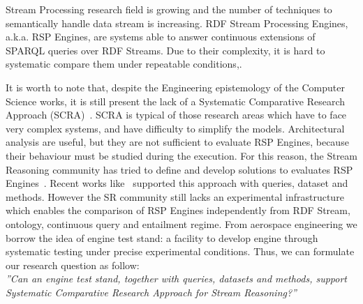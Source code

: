 Stream Processing research field is growing and the number of techniques to semantically handle data stream is increasing. RDF Stream Processing Engines, a.k.a. RSP Engines, are systems able to answer continuous extensions of SPARQL queries over RDF Streams. Due to their complexity, it is hard to systematic compare them under repeatable conditions,. 

It is worth to note that, despite the Engineering epistemology of the Computer Science works, it is still present the lack of a Systematic Comparative Research Approach (SCRA)~\cite{Tichy:1995:EEC:209090.209093}. SCRA is typical of those research areas which have to face very complex systems, and have difficulty to simplify the models. Architectural analysis are useful, but they are not sufficient to evaluate RSP Engines, because their behaviour must be studied during the execution. For this reason, the Stream Reasoning community has tried to define and develop solutions to evaluates RSP Engines~\cite{DBLP:conf/esws/ScharrenbachUMVB13}. Recent works like~\cite{Zhang2012, LePhuoc2012c, DBLP:conf/semweb/DellAglioCBCV13} supported this approach with queries, dataset and methods. However the SR community still lacks an experimental infrastructure which enables the comparison of RSP Engines independently from RDF Stream, ontology, continuous query and entailment regime.  From aerospace engineering we borrow the idea of engine test stand: a facility to develop engine through systematic testing under precise experimental conditions. Thus, we can formulate our research question as follow:\\

\textit{”Can an engine test stand, together with queries, datasets and methods, support Systematic Comparative Research Approach for Stream Reasoning?”}\\


